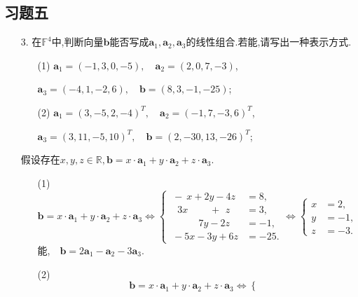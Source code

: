 \documentclass{article}
\begin{document}
\subsection{习题五}
    \begin{enumerate}
        \item [3.]在$\mathbb{F}^4$中,判断向量$\boldsymbol{b}$能否写成$\boldsymbol{a}_1,\boldsymbol{a}_2,\boldsymbol{a}_3$的线性组合.若能,请写出一种表示方式.
        \begin{enumerate}
            \item [(1)]$\boldsymbol{a}_1=(-1,3,0,-5),\quad \boldsymbol{a}_2=(2,0,7,-3)$,
            \item []$\boldsymbol{a}_3=(-4,1,-2,6),\quad \boldsymbol{b}=(8,3,-1,-25)$;
            \item [(2)]$\boldsymbol{a}_1={(3,-5,2,-4)}^T,\quad \boldsymbol{a}_2={(-1,7,-3,6)}^T$,
            \item []$\boldsymbol{a}_3={(3,11,-5,10)}^T,\quad \boldsymbol{b}={(2,-30,13,-26)}^T$;
        \end{enumerate}
        假设存在$x,y,z\in \mathbb{R},\boldsymbol{b}=x\cdot\boldsymbol{a}_1+y\cdot\boldsymbol{a}_2+z\cdot\boldsymbol{a}_3$.
        \begin{enumerate}
            \item [(1)]
            \[
                \boldsymbol{b}=x\cdot\boldsymbol{a}_1+y\cdot\boldsymbol{a}_2+z\cdot\boldsymbol{a}_3
                \Leftrightarrow
                \begin{cases}
                    \ -\ x+2y-4z &=8,\\
                    \ \ \;3x\qquad\ +\ \,z &=3,\\
                    \ \qquad \ \ \ 7y-2z &= -1,\\
                    \ -5x-3y+6z &=-25.
                \end{cases}
                \Leftrightarrow
                \begin{cases}
                    x&=2,\\
                    y&=-1,\\
                    z&=-3.
                \end{cases}
            \]
            能,$\quad\boldsymbol{b}=2\boldsymbol{a}_1-\boldsymbol{a}_2-3\boldsymbol{a}_3$.
            \item [(2)]
            \[
                \boldsymbol{b}=x\cdot\boldsymbol{a}_1+y\cdot\boldsymbol{a}_2+z\cdot\boldsymbol{a}_3
                \Leftrightarrow
                \begin{cases}

\end{cases}\]
\end{enumerate}
\end{enumerate}
\end{document}
